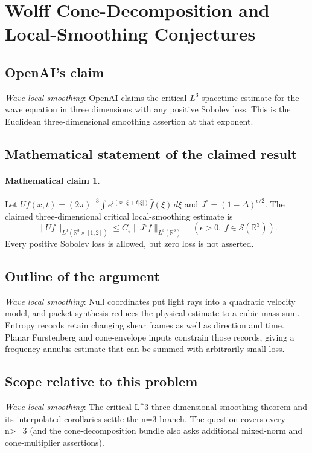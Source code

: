 \documentclass[11pt]{article}
\begin{document}
\section*{Wolff Cone-Decomposition and Local-Smoothing Conjectures}

\subsection{OpenAI's claim}
\textit{Wave local smoothing}: OpenAI claims the critical $L^3$ spacetime estimate for the wave equation in three dimensions with any positive Sobolev loss. This is the Euclidean three-dimensional smoothing assertion at that exponent.

\subsection{Mathematical statement of the claimed result}
\paragraph{Mathematical claim 1.} Let $Uf(x,t)=(2\pi)^{-3}\int e^{i(x\cdot\xi+t|\xi|)}\widehat f(\xi)\,d\xi$ and $J^\epsilon=(1-\Delta)^{\epsilon/2}$. The claimed three-dimensional critical local-smoothing estimate is \[\|Uf\|_{L^3(\mathbb R^3\times[1,2])}\le C_\epsilon\|J^\epsilon f\|_{L^3(\mathbb R^3)}\quad(\epsilon>0,\ f\in\mathcal S(\mathbb R^3)).\] Every positive Sobolev loss is allowed, but zero loss is not asserted.

\subsection{Outline of the argument}
\textit{Wave local smoothing}: Null coordinates put light rays into a quadratic velocity model, and packet synthesis reduces the physical estimate to a cubic mass sum. Entropy records retain changing shear frames as well as direction and time. Planar Furstenberg and cone-envelope inputs constrain those records, giving a frequency-annulus estimate that can be summed with arbitrarily small loss.

\subsection{Scope relative to this problem}
\textit{Wave local smoothing}: The critical L\textasciicircum{}3 three-dimensional smoothing theorem and its interpolated corollaries settle the n=3 branch. The question covers every n>=3 (and the cone-decomposition bundle also asks additional mixed-norm and cone-multiplier assertions).
\end{document}
